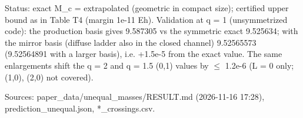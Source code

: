 \begin{table}[t]
\par\footnotesize Status: exact M\_c = extrapolated (geometric in compact size); certified upper bound as in Table T4 (margin 1e-11 Eh). Validation at q = 1 (unsymmetrized code): the production basis gives 9.587305 vs the symmetric exact 9.525634; with the mirror basis (diffuse ladder also in the closed channel) 9.52565573 (9.52564891 with a larger basis), i.e. +1.5e-5 from the exact value. The same enlargements shift the q = 2 and q = 1.5 (0,1) values by $\le$ 1.2e-6 (L = 0 only; (1,0), (2,0) not covered).
\par\footnotesize Sources: paper\_data/unequal\_masses/RESULT.md (2026-11-16 17:28), prediction\_unequal.json, *\_crossings.csv.
\end{table}

